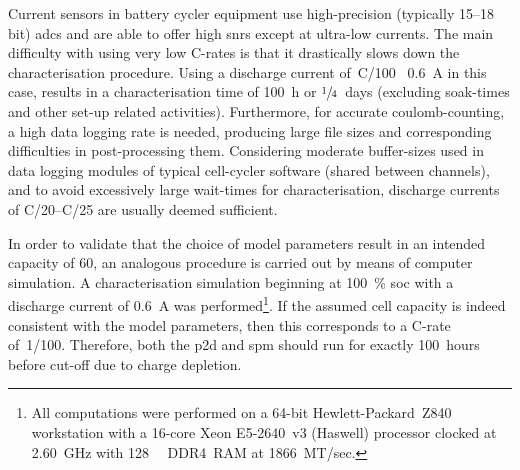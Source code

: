Current sensors in battery cycler equipment use high-precision (typically 15--18
bit) \glspl{adc}  and are  able to  offer high  \glspl{snr} except  at ultra-low
currents. The main difficulty with using very low C-rates is that it drastically
slows down  the characterisation procedure.  Using a discharge  current of~C/100
\ie~\SI{0.6}{\ampere}  in  this case,  results  in  a characterisation  time  of
\SI{100}{\hour} or \mbox{$\sfrac{1}{4}$}~days (excluding soak-times and
other set-up related activities).  Furthermore, for accurate coulomb-counting, a
high data logging  rate is needed, producing large file  sizes and corresponding
difficulties in post-processing them.  Considering moderate buffer-sizes used in
data logging modules of typical  cell-cycler software (shared between channels),
and  to  avoid  excessively  large wait-times  for  characterisation,  discharge
currents of C/20--C/25 are usually deemed sufficient.

In    order   to    validate    that   the    choice    of   model    parameters
result   in   an   intended   capacity  of   \SI{60}{\amphour},   an   analogous
procedure   is    carried   out   by    means   of   computer    simulation.   A
characterisation  simulation  beginning  at  \SI{100}{\percent}  \gls{soc}  with
a   discharge   current    of   \SI{0.6}{\ampere}   was   performed\footnote{All
computations  were  performed  on   a  64-bit  Hewlett-Packard~Z840  workstation
with   a   \mbox{16-core}   \mbox{\textsuperscript{\textregistered}}
\mbox{Xeon\textsuperscript{\textregistered}}     \mbox{E5-2640~v3}     (Haswell)
processor clocked  at \SI{2.60}{\giga\hertz} with  \SI{128}{\giga\byte} DDR4~RAM
at 1866~MT/sec.}.  If the assumed  cell capacity  is indeed consistent  with the
model parameters,  then this corresponds to  a C-rate of~1/100.  Therefore, both
the \gls{p2d} and \gls{spm} should run  for exactly 100~hours before cut-off due
to charge depletion.


